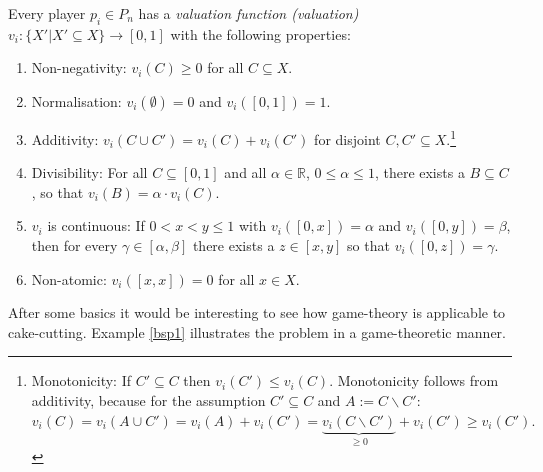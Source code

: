 Every player $p_i\in P_n$ has a \emph{valuation function (valuation)} $v_i:\{X'|X' \subseteq X\} \rightarrow [0,1]$ with the following properties:
\begin{enumerate}
\item Non-negativity: $v_i(C)\geq 0$ for all $C\subseteq X.$
\item Normalisation: $v_i(\emptyset)=0$ and $v_i([0,1])=1.$
\item Additivity: $v_i(C \cup C')=v_i(C)+v_i(C')$ for disjoint
$C,C'\subseteq X.$\footnote{Monotonicity: If $C' \subseteq C$ then $v_i(C') \leq v_i(C)$. Monotonicity follows from additivity, because for the assumption $C' \subseteq C$ and $A:=C\backslash C'$: $v_i(C)=v_i(A\cup C')=v_i(A)+v_i(C')=\underbrace{v_i(C\backslash C')}_{\geq 0}+v_i(C')\geq v_i(C').$}
\item Divisibility: For all $C\subseteq [0,1]$ and all $\alpha \in
\mathbb{R}$, $0\leq \alpha \leq 1$, there exists a $B\subseteq C$, so that
$v_i(B)=\alpha \cdot v_i(C).$
\item  $v_i$ is continuous: If $0<x<y\leq 1$ with $v_i([0,x])=\alpha$ and
$v_i([0,y])=\beta$, then for every $\gamma \in [\alpha,\beta]$ there exists a $z \in [x,y]$ so that $v_i([0,z])=\gamma.$
\item Non-atomic:  $v_i([x,x])=0$ for all $x\in X.$
\end{enumerate}
After some basics it would be interesting to see how game-theory is applicable to cake-cutting. Example \ref{bsp1} illustrates the problem in a game-theoretic manner.
%
